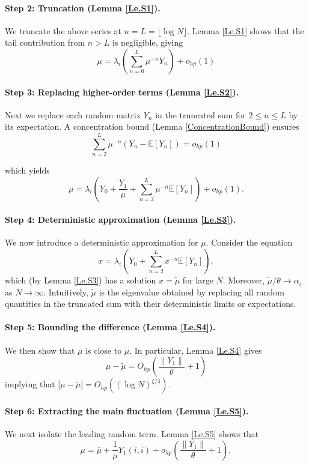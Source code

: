 \documentclass[11pt, reqno]{amsart}
\numberwithin{equation}{section}
\newcommand{\E}{\mbox{${\mathbb E}$}}
\begin{document}
\paragraph{\bf Step 2: Truncation (Lemma \ref{Le.S1}).} We truncate the above series at $n=L=\lfloor \log N\rfloor$. Lemma \ref{Le.S1} shows that the tail contribution from $n>L$ is negligible, giving
    \[
    \mu=\lambda_i\left(\sum_{n=0}^L \mu^{-n} Y_n\right)+o_{h p}(1)
    \]

\paragraph{\bf Step 3: Replacing higher-order terms (Lemma \ref{Le.S2}).} Next we replace each random matrix $Y_n$ in the truncated sum for $2 \le n \le L$ by its expectation. A concentration bound (Lemma \ref{ConcentrationBound}) ensures
    \[
    \sum_{n=2}^L \mu^{-n}\left(Y_n-\E[Y_n]\right)=o_{h p}(1)
    \]
   

    which yields
  \[
  \mu=\lambda_i\left(Y_0+\frac{Y_1}{\mu}+\sum_{n=2}^L \mu^{-n} \E\left[Y_n\right]\right)+o_{h p}(1).
  \]
\paragraph{\bf Step 4: Deterministic approximation (Lemma \ref{Le.S3}).} We now introduce a deterministic approximation for $\mu$. Consider the equation
    \[
    x=\lambda_i\left(Y_0 + \sum_{n=2}^L x^{-n} \E\left[Y_n\right]\right),
    \]
    which (by Lemma \ref{Le.S3}) has a solution $x=\tilde{\mu}$ for large $N$. Moreover, $\tilde{\mu}/\theta \to \alpha_i$ as $N\to\infty$. Intuitively, $\tilde{\mu}$ is the eigenvalue obtained by replacing all random quantities in the truncated sum with their deterministic limits or expectations.

\paragraph{\bf Step 5: Bounding the difference (Lemma \ref{Le.S4}).} We then show that $\mu$ is close to $\tilde{\mu}$. In particular, Lemma \ref{Le.S4} gives
    \[
    \mu-\tilde{\mu}=O_{h p}\left(\frac{\left\|Y_1\right\|}{\theta}+1\right)
    \]
    implying that $|\mu-\tilde{\mu}|= O_{hp}((\log N)^{\xi/4})$.

\paragraph{\bf Step 6: Extracting the main fluctuation (Lemma \ref{Le.S5}).} We next isolate the leading random term. Lemma \ref{Le.S5} shows that
   \[
   \mu=\bar{\mu}+\frac{1}{\mu} Y_1(i, i)+o_{h p}\left(\frac{\left\|Y_1\right\|}{\theta}+1\right),
   \]
\end{document}
